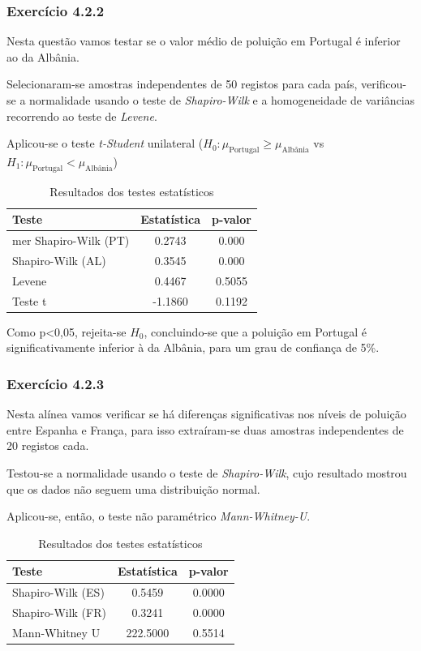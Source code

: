 \documentclass[conference]{IEEEtran}
\begin{document}
\medskip
\subsubsection{\textbf{Exercício 4.2.2}}

Nesta questão vamos testar se o valor médio de poluição em Portugal é inferior ao da Albânia.

Selecionaram-se amostras independentes de 50 registos para cada país, verificou-se a normalidade usando o teste de \textit{Shapiro-Wilk} e a  homogeneidade de variâncias recorrendo ao teste de \textit{Levene}. 

Aplicou-se o teste \textit{t-Student} unilateral ($H_{0}: \mu_{\text{Portugal}} \geq \mu_{\text{Albânia}}$ vs $H_{1}: \mu_{\text{Portugal}} < \mu_{\text{Albânia}}$)

	\begin{table}[H]
		\centering
		\caption{Resultados dos testes estatísticos}
		\begin{tabular}{lcc}
			\toprule
			Teste & Estatística & p-valor \\
			\midrule
mer			Shapiro-Wilk (PT) & 0.2743 & 0.000 \\
			Shapiro-Wilk (AL) & 0.3545 & 0.000 \\
			Levene & 0.4467 & 0.5055 \\
			Teste t & -1.1860 & 0.1192 \\
			\bottomrule
		\end{tabular}
	\end{table}

Como p\textless0,05, rejeita-se $H_{0}$, concluindo-se que a poluição em Portugal é significativamente inferior à da Albânia, para um grau de confiança de 5\%.
\medskip
\subsubsection{\textbf{Exercício 4.2.3}}

Nesta alínea vamos verificar se há diferenças significativas nos níveis de poluição entre Espanha e França, para isso extraíram-se duas amostras independentes de 20 registos cada.

Testou-se a normalidade usando o teste de \textit{Shapiro-Wilk}, cujo resultado mostrou que os dados não seguem uma distribuição normal.

Aplicou-se, então, o teste não paramétrico \textit{Mann-Whitney-U}.

	\begin{table}[H]
		\centering
		\caption{Resultados dos testes estatísticos}
		\begin{tabular}{lcc}
			\toprule
			Teste & Estatística & p-valor \\
			\midrule
			Shapiro-Wilk (ES) & 0.5459 & 0.0000 \\
			Shapiro-Wilk (FR) & 0.3241 & 0.0000 \\
			Mann-Whitney U & 222.5000 & 0.5514 \\
			\bottomrule
		\end{tabular}
	\end{table}
\end{document}
